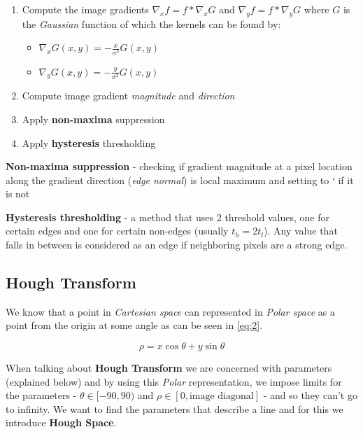 \documentclass[lettersize,journal]{IEEEtran}
\begin{document}
\begin{enumerate}
    \item Compute the image gradients $\nabla_x f = f * \nabla_x G$ and $\nabla_y f = f *\nabla_y G$ where $G$ is the \emph{Gaussian} function of which the kernels can be found by:
    \begin{itemize}
        \item $\nabla_x G(x, y)=-\frac{x}{\sigma^2}G(x, y)$
        \item $\nabla_y G(x, y)=-\frac{y}{\sigma^2}G(x, y)$
    \end{itemize}
    \item Compute image gradient \emph{magnitude} and \emph{direction}
    \item Apply \textbf{non-maxima} suppression
    \item Apply \textbf{hysteresis} thresholding
\end{enumerate}

\hfill

\noindent\textbf{Non-maxima suppression} - checking if gradient magnitude at a pixel location along the gradient direction (\emph{edge normal}) is local maximum and setting to ` if it is not

\hfill

\noindent\textbf{Hysteresis thresholding} - a method that uses 2 threshold values, one for certain edges and one for certain non-edges (usually $t_h = 2t_l$). Any value that falls in between is considered as an edge if neighboring pixels are a strong edge.

\subsection{Hough Transform}

We know that a point in \emph{Cartesian space} can represented in \emph{Polar space} as a point from the origin at some angle as can be seen in \autoref{eq:2}.

\begin{equation}\label{eq:2}
    \rho = x \cos \theta + y \sin \theta
\end{equation}

When talking about \textbf{Hough Transform} we are concerned with parameters (explained below) and by using this \emph{Polar} representation, we impose limits for the parameters - $\theta\in[-90, 90)$ and $\rho\in[0, \text{image diagonal}]$ - and so they can't go to infinity. We want to find the parameters that describe a line and for this we introduce \textbf{Hough Space}.
\end{document}
